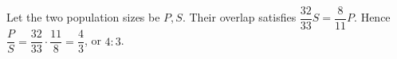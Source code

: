 Let the two population sizes be $ P,S $. Their overlap satisfies $\dfrac{32}{33}S=\dfrac{8}{11}P $. Hence $\dfrac{P}{S}=\dfrac{32}{33}\cdot\dfrac{11}{8}=\boxed{\dfrac{4}{3}}$, or $\boxed{4:3}$.
